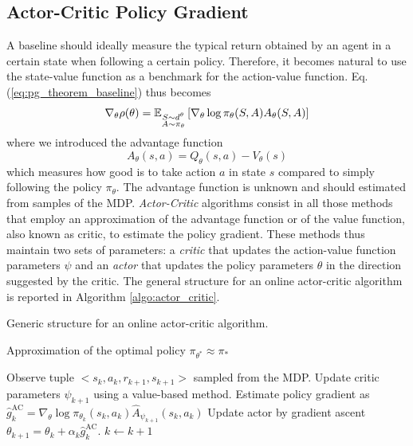 \subsection{Actor-Critic Policy Gradient}
A baseline should ideally measure the typical return obtained by an agent in a certain state when following a certain policy. Therefore, it becomes natural to use the state-value function as a benchmark for the action-value function. Eq. (\ref{eq:pg_theorem_baseline}) thus becomes
\begin{equation}
\label{eq:actor_critic_pg}
	\nabla_\theta \rho(\theta) =
		\E[\substack{S \sim d^\theta\\A \sim \pi_\theta}]{\nabla_\theta\log
		\pi_\theta(S,A) A_\theta(S,A)}
\end{equation} 
where we introduced the advantage function
\begin{equation}
	A_\theta(s,a) = Q_\theta(s,a) - V_\theta(s)
\end{equation}
which measures how good is to take action $a$ in state $s$ compared to simply following the policy $\pi_\theta$. The advantage function is unknown and should estimated from samples of the MDP. \emph{Actor-Critic} algorithms consist in all those methods that employ an approximation of the advantage function or of the value function, also known as critic, to estimate the policy gradient. These methods thus maintain two sets of parameters: a \emph{critic} that updates the action-value function parameters $\psi$ and an \emph{actor} that updates the policy parameters $\theta$ in the direction suggested by the critic. The general structure for an online actor-critic algorithm is reported in Algorithm \ref{algo:actor_critic}.\\
\begin{algorithm}[t]
	\caption{Generic structure for an online actor-critic algorithm.}
	\label{algo:actor_critic}
	\begin{algorithmic}[0]
		\Ensure Approximation of the optimal policy $\pi_{\theta^*} \approx \pi_*$
		\begin{algorithmic}[1]
		\Repeat
			\State Observe tuple $<s_k, a_k, r_{k+1}, s_{k+1}>$ sampled from the MDP.
			\State Update critic parameters $\psi_{k+1}$ using a value-based method. 
			\State Estimate policy gradient as $\widehat{g}_k^\text{AC} = \nabla_\theta \log \pi_{\theta_k}(s_k, a_k) \widehat{A}_{\psi_{k+1}}(s_k, a_k)$
			\State Update actor by gradient ascent $\theta_{k+1} = \theta_k + \alpha_k \widehat{g}_k^\text{AC}$. 
			\State $k \leftarrow k + 1$
		\end{algorithmic}
	\end{algorithmic}
\end{algorithm}
